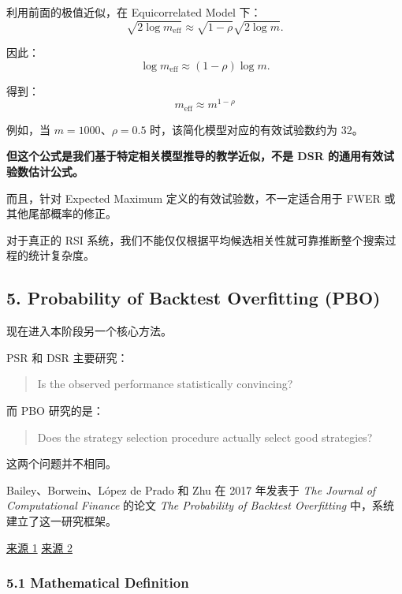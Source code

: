 利用前面的极值近似，在 Equicorrelated Model 下：
\[\sqrt{2\log m_{\mathrm{eff}}}
\approx
\sqrt{1-\rho}\sqrt{2\log m}.\]

因此：
\[\log m_{\mathrm{eff}}
\approx
(1-\rho)\log m.\]

得到：
\[\boxed{
m_{\mathrm{eff}}\approx m^{1-\rho}
}\]

例如，当 \(m=1000\)、\(\rho=0.5\) 时，该简化模型对应的有效试验数约为 32。

\textbf{但这个公式是我们基于特定相关模型推导的教学近似，不是 DSR 的通用有效试验数估计公式。}

而且，针对 Expected Maximum 定义的有效试验数，不一定适合用于 FWER 或其他尾部概率的修正。

对于真正的 RSI 系统，我们不能仅仅根据平均候选相关性就可靠推断整个搜索过程的统计复杂度。

\hypertarget{part-4-71-0001-probability-of-backtest-overfitting-pbo}{%
\subsection{5. Probability of Backtest Overfitting (PBO)}\label{part-4-71-0001-probability-of-backtest-overfitting-pbo}}

现在进入本阶段另一个核心方法。

PSR 和 DSR 主要研究：

\begin{quote}
Is the observed performance statistically convincing?
\end{quote}

而 PBO 研究的是：

\begin{quote}
Does the strategy selection procedure actually select good strategies?
\end{quote}

这两个问题并不相同。

Bailey、Borwein、López de Prado 和 Zhu 在 2017 年发表于 \emph{The Journal of Computational Finance} 的论文 \emph{The Probability of Backtest Overfitting} 中，系统建立了这一研究框架。

\href{https://www.risk.net/journal-of-computational-finance/2471206/the-probability-of-backtest-overfitting}{来源 1} \href{https://scholarworks.wmich.edu/math_pubs/42/}{来源 2}

\hypertarget{part-4-71-0001-mathematical-definition}{%
\subsubsection{5.1 Mathematical Definition}\label{part-4-71-0001-mathematical-definition}}

